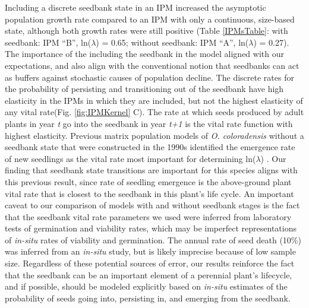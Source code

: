 \documentclass[12pt, letterpaper]{article}
\begin{document}
Including a discrete seedbank state in an IPM increased the asymptotic population growth rate compared to an IPM with only a continuous, size-based state, although both growth rates were still positive (Table \ref{IPMsTable}: with seedbank: IPM “B”, ln($\lambda$) = 0.65; without seedbank: IPM “A”, ln($\lambda$) = 0.27). The importance of the including the seedbank in the model aligned with our expectations, and also align with the conventional notion that seedbanks can act as buffers against stochastic causes of population decline. The discrete rates for the probability of persisting and transitioning out of the seedbank have high elasticity in the IPMs in which they are included, but not the highest elasticity of any vital rate(Fig. \ref{fig:IPMKernel} C). The rate at which seeds produced by adult plants in year \textit{t} go into the seedbank in year \textit{t+1} is the vital rate function with highest elasticity. Previous matrix population models of \textit{O. coloradensis} without a seedbank state that were constructed in the 1990s identified the emergence rate of new seedlings as the vital rate most important for determining ln($\lambda$) \cite{Floyd1998}. Our finding that seedbank state transitions are important for this species aligns with this previous result, since rate of seedling emergence is the above-ground plant vital rate that is closest to the seedbank in this plant’s life cycle. An important caveat to our comparison of models with and without seedbank stages is the fact that the seedbank vital rate parameters we used were inferred from laboratory tests of germination and viability rates, which may be imperfect representations of \textit{in-situ} rates of viability and germination. The annual rate of seed death (10\%) was inferred from an \textit{in-situ} study, but is likely imprecise because of low sample size. Regardless of these potential sources of error, our results reinforce the fact that the seedbank can be an important element of a perennial plant’s lifecycle, and if possible, should be modeled explicitly based on \textit{in-situ} estimates of the probability of seeds going into, persisting in, and emerging from the seedbank.      
\end{document}
